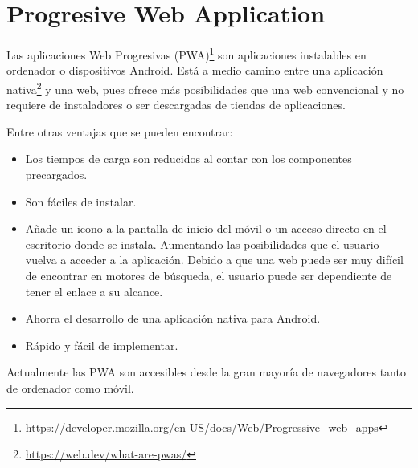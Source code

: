 \section{Progresive Web Application}


Las aplicaciones Web Progresivas (PWA)\footnote{\url{https://developer.mozilla.org/en-US/docs/Web/Progressive_web_apps}} son aplicaciones instalables en ordenador o dispositivos Android. Está a medio camino entre una aplicación nativa\footnote{\url{https://web.dev/what-are-pwas/}}  y una web, pues ofrece más posibilidades que una web convencional y no requiere de instaladores o ser descargadas de tiendas de aplicaciones.
    
Entre otras ventajas que se pueden encontrar:

\begin{itemize}
	\item Los tiempos de carga son reducidos al contar con los componentes precargados.
	
	
	\item Son fáciles de instalar.
	
	\item Añade un icono a la pantalla de inicio del móvil o un acceso directo en el escritorio donde se instala. Aumentando las posibilidades que el usuario vuelva a acceder a la aplicación. Debido a que una web puede ser muy difícil de encontrar en motores de búsqueda, el usuario puede ser dependiente de tener el enlace a su alcance.
	
	\item Ahorra el desarrollo de una aplicación nativa para Android. 
	
	\item Rápido y fácil de implementar.
	
\end{itemize}

Actualmente las PWA son accesibles desde la gran mayoría de navegadores tanto de ordenador como móvil.






